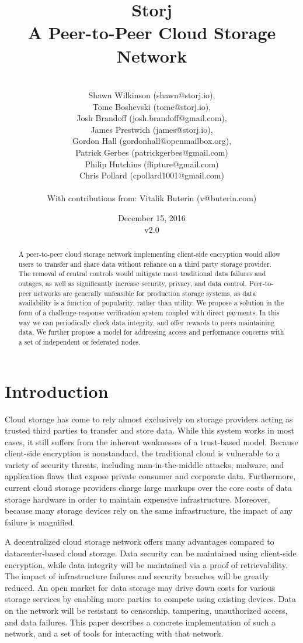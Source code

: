 \documentclass[a4paper,10pt]{article}
\title{\textbf{Storj\\A Peer-to-Peer Cloud Storage Network}}
\author{\\
Shawn Wilkinson (shawn@storj.io),\\
Tome Boshevski (tome@storj.io),\\
Josh Brandoff (josh.brandoff@gmail.com),\\
James Prestwich (james@storj.io),\\
Gordon Hall (gordonhall@openmailbox.org),\\
Patrick Gerbes (patrickgerbes@gmail.com)\\
Philip Hutchins (flipture@gmail.com)\\
Chris Pollard (cpollard1001@gmail.com)\\
\\
With contributions from: Vitalik Buterin (v@buterin.com)
}
\date {December 15, 2016 \\ v2.0}
\begin{document}
\maketitle
\begin{abstract}
A peer-to-peer cloud storage network implementing client-side encryption would allow users to transfer and share data without reliance on a third party storage provider. The removal of central controls would mitigate most traditional data failures and outages, as well as significantly increase security, privacy, and data control. Peer-to-peer networks are generally unfeasible for production storage systems, as data availability is a function of popularity, rather than utility. We propose a solution in the form of a challenge-response verification system coupled with direct payments. In this way we can periodically check data integrity, and offer rewards to peers maintaining data. We further propose a model for addressing access and performance concerns with a set of independent or federated nodes.
\end{abstract}


\section{Introduction}
Cloud storage has come to rely almost exclusively on storage providers acting as trusted third parties to transfer and store data. While this system works in most cases, it still suffers from the inherent weaknesses of a trust-based model. Because client-side encryption is nonstandard, the traditional cloud is vulnerable to a variety of security threats, including man-in-the-middle attacks, malware, and application flaws that expose private consumer and corporate data. Furthermore, current cloud storage providers charge large markups over the core costs of data storage hardware in order to maintain expensive infrastructure. Moreover, because many storage devices rely on the same infrastructure, the impact of any failure is magnified.

A decentralized cloud storage network offers many advantages compared to datacenter-based cloud storage. Data security can be maintained using client-side encryption, while data integrity will be maintained via a proof of retrievability. The impact of infrastructure failures and security breaches will be greatly reduced. An open market for data storage may drive down costs for various storage services by enabling more parties to compete using existing devices. Data on the network will be resistant to censorship, tampering, unauthorized access, and data failures. This paper describes a concrete implementation of such a network, and a set of tools for interacting with that network.
\end{document}
